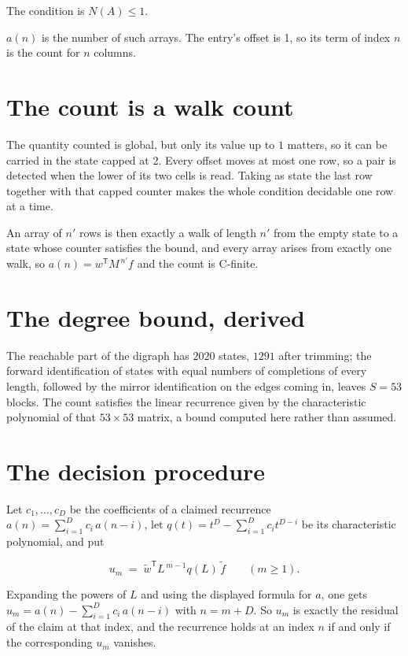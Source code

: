 \documentclass[11pt]{article}
\theoremstyle{definition}
\begin{document}
The condition is $N(A) \le 1$.

$a(n)$ is the number of such arrays. The entry's offset is 1, so its term of index $n$ is the count for $n$ columns.

\section{The count is a walk count}

The quantity counted is global, but only its value up to $1$ matters, so it can be carried in the state capped at $2$. Every offset moves at most one row, so a pair is detected when the lower of its two cells is read. Taking as state the last row together with that capped counter makes the whole condition decidable one row at a time.

An array of $n'$ rows is then exactly a walk of length $n'$ from the empty state to a state whose counter satisfies the bound, and every array arises from exactly one walk, so $a(n) = w^{\mathsf T}M^{\,n'}f$ and the count is C-finite.

\section{The degree bound, derived}

The reachable part of the digraph has $2020$ states, $1291$ after trimming; the forward identification of states with equal numbers of completions of every length, followed by the mirror identification on the edges coming in, leaves $S = 53$ blocks. The count satisfies the linear recurrence given by the characteristic polynomial of that $53\times53$ matrix, a bound computed here rather than assumed.

\section{The decision procedure}

Let $c_1,\dots,c_D$ be the coefficients of a claimed recurrence $a(n) = \sum_{i=1}^{D} c_i\,a(n-i)$, let $q(t) = t^{D} - \sum_{i=1}^{D} c_i t^{D-i}$ be its characteristic polynomial, and put

\[u_m \;=\; \tilde w^{\mathsf T} L^{\,m-1} q(L)\,\tilde f \qquad (m \ge 1).\]

Expanding the powers of $L$ and using the displayed formula for $a$, one gets $u_m = a(n) - \sum_{i=1}^{D} c_i\,a(n-i)$ with $n = m + D$. So $u_m$ is exactly the residual of the claim at that index, and the recurrence holds at an index $n$ if and only if the corresponding $u_m$ vanishes.
\end{document}
